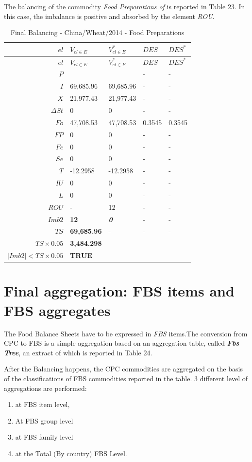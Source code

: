 \documentclass[]{article}
\providecommand{\tightlist}{%
  \setlength{\itemsep}{0pt}\setlength{\parskip}{0pt}}
\begin{document}
The balancing of the commodity \emph{Food Preparations of} is reported
in Table 23. In this case, the imbalance is positive and absorbed by the
element \emph{ROU}.

\begin{longtable}[]{@{}rllll@{}}
\caption{Final Balancing - China/Wheat/2014 - Food
Preparations}\tabularnewline
\toprule
\boldmath\(el\) & \boldmath\(V_{el \in E}\) &
\boldmath\(V^*_{el \in E}\) & \boldmath\(DES\) &
\boldmath\(DES^*\)\tabularnewline
\midrule
\endfirsthead
\toprule
\boldmath\(el\) & \boldmath\(V_{el \in E}\) &
\boldmath\(V^*_{el \in E}\) & \boldmath\(DES\) &
\boldmath\(DES^*\)\tabularnewline
\midrule
\endhead
\(P\) & & & - & -\tabularnewline
\(I\) & 69,685.96 & 69,685.96 & - & -\tabularnewline
\(X\) & 21,977.43 & 21,977.43 & - & -\tabularnewline
\(\Delta St\) & 0 & 0 & - & -\tabularnewline
\(Fo\) & 47,708.53 & 47,708.53 & 0.3545 & 0.3545\tabularnewline
\(FP\) & 0 & 0 & - & -\tabularnewline
\(Fe\) & 0 & 0 & - & -\tabularnewline
\(Se\) & 0 & 0 & - & -\tabularnewline
\(T\) & -12.2958 & -12.2958 & - & -\tabularnewline
\(IU\) & 0 & 0 & - & -\tabularnewline
\(L\) & 0 & 0 & - & -\tabularnewline
\(ROU\) & - & 12 & - & -\tabularnewline
\boldmath\(Imb2\) & \textbf{12} & \textbf{\emph{0}} & - &
-\tabularnewline
\boldmath\(TS\) & \textbf{69,685.96} & - & - & -\tabularnewline
\boldmath\(TS \times 0.05\) & \textbf{3,484.298} & & &\tabularnewline
\boldmath\(|Imb2| < TS \times 0.05\) & \textbf{TRUE} & &
&\tabularnewline
\bottomrule
\end{longtable}

\section{Final aggregation: FBS items and FBS
aggregates}\label{final-aggregation-fbs-items-and-fbs-aggregates}

The Food Balance Sheets have to be expressed in \emph{FBS} items.The
conversion from CPC to FBS is a simple aggregation based on an
aggregation table, called \textbf{\emph{Fbs Tree}}, an extract of which
is reported in Table 24.

After the Balancing happens, the CPC commodities are aggregated on the
basis of the classifications of FBS commodities reported in the table. 3
different level of aggregations are performed:

\begin{enumerate}
\def\labelenumi{\arabic{enumi}.}
\tightlist
\item
  at FBS item level,
\item
  At FBS group level
\item
  at FBS family level
\item
  at the Total (By country) FBS Level.
\end{enumerate}
\end{document}
